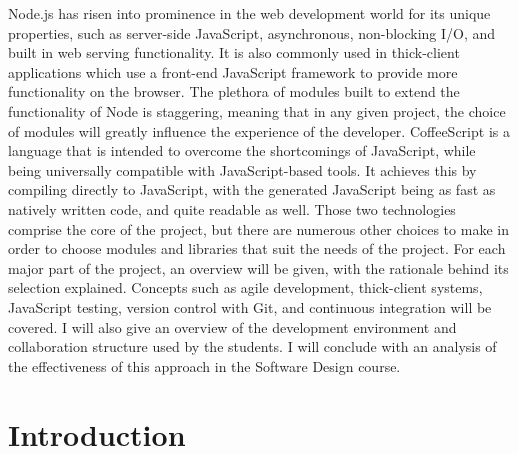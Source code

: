 \documentclass[12pt]{article}
\begin{document}
Node.js has risen into prominence in the web development world for its unique properties, such as server-side JavaScript, asynchronous, non-blocking I/O, and built in web serving functionality. It is also commonly used in thick-client applications which use a front-end JavaScript framework to provide more functionality on the browser. The plethora of modules built to extend the functionality of Node is staggering, meaning that in any given project, the choice of modules will greatly influence the experience of the developer. CoffeeScript is a language that is intended to overcome the shortcomings of JavaScript, while being universally compatible with JavaScript-based tools. It achieves this by compiling directly to JavaScript, with the generated JavaScript being as fast as natively written code, and quite readable as well. Those two technologies comprise the core of the project, but there are numerous other choices to make in order to choose modules and libraries that suit the needs of the project. For each major part of the project, an overview will be given, with the rationale behind its selection explained. Concepts such as agile development, thick-client systems, JavaScript testing, version control with Git, and continuous integration will be covered. I will also give an overview of the development environment and collaboration structure used by the students. I will conclude with an analysis of the effectiveness of this approach in the Software Design course.


\newpage

\setcounter{page}{1}


\section{Introduction}\label{sec:introduction}
\end{document}
